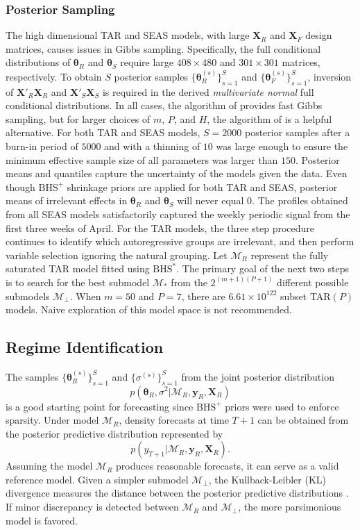 \subsubsection{Posterior Sampling}
The high dimensional TAR and SEAS models, with large $\bm{X}_R$ and $\bm{X}_F$ design matrices, causes issues in Gibbs sampling. Specifically, the full conditional distributions of $\bm{\theta}_R$ and $\bm{\theta}_S$ require large $408\times 480$ and $301\times 301$ matrices, respectively. To obtain $S$ posterior samples $\{\bm{\theta}^{(s)}_R\}_{s=1}^{S}$ and $\{\bm{\theta}^{(s)}_F\}_{s=1}^{S}$, inversion of $\bm{X}'_R\bm{X}_R$ and $\bm{X}'_S\bm{X}_S$ is required in the derived \textit{multivariate normal} full conditional distributions. In all cases, the algorithm of \cite{Rue2001} provides fast Gibbs sampling, but for larger choices of $m$, $P$, and $H$, the algorithm of \cite{Bhattacharya2016} is a helpful alternative. For both TAR and SEAS models,  $S=2000$ posterior samples after a burn-in period of $5000$ and with a thinning of $10$ was large enough to ensure the minimum effective sample size of all parameters was larger than $150$. Posterior means and quantiles capture the uncertainty of the models given the data. Even though $\textrm{BHS}^+$ shrinkage priors are applied for both TAR and SEAS, posterior means of irrelevant effects in $\bm{\theta}_R$ and $\bm{\theta}_S$ will never equal 0. The profiles obtained from all SEAS models satisfactorily captured the weekly periodic signal from the first three weeks of April. For the TAR models, the three step procedure continues to identify which autoregressive groups are irrelevant, and then perform variable selection ignoring the natural grouping. Let $\mathcal{M}_R$ represent the fully saturated TAR model fitted using $\textrm{BHS}^*$. The primary goal of the next two steps is to search for the best submodel $\mathcal{M}_*$ from the $2^{(m+1)(P+1)}$ different possible submodels $\mathcal{M}_\perp$. When $m=50$ and $P=7$, there are $6.61\times 10^{122}$ subset TAR$(P)$ models. Naive exploration of this model space is not recommended.

\subsection{Regime Identification}
\label{sec:stage2}

The samples $\{\bm{\theta}^{(s)}_R\}_{s=1}^S$ and $\{\sigma^{(s)}\}_{s=1}^S$ from the joint posterior distribution $$p(\bm{\theta}_{R},\sigma^2|\mathcal{M}_R,\bm{y}_R,\bm{X}_R)$$ is a good starting point for forecasting since $\textrm{BHS}^+$ priors were used to enforce sparsity. Under model $\mathcal{M}_R$, density forecasts at time $T+1$ can be obtained from the posterior predictive distribution represented by $$p(y_{T+1}|\mathcal{M}_R,\bm{y}_R,\bm{X}_R).$$ Assuming the model $\mathcal{M}_R$ produces reasonable forecasts, it can serve as a valid reference model. Given a simpler submodel $\mathcal{M}_\perp$, the Kullback-Leibler (KL) divergence \citep{Kullback1951} measures the distance between the posterior predictive distributions \citep{Goutis1998,Dupuis2003}. If minor discrepancy is detected between $\mathcal{M}_R$  and $\mathcal{M}_\perp$, the more parsimonious model is favored. 

